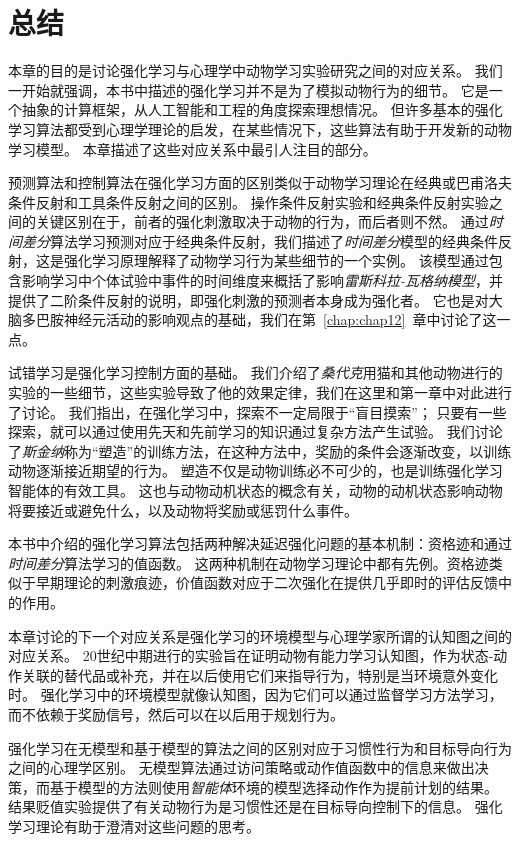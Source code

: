 \section{总结}

本章的目的是讨论强化学习与心理学中动物学习实验研究之间的对应关系。
我们一开始就强调，本书中描述的强化学习并不是为了模拟动物行为的细节。
它是一个抽象的计算框架，从人工智能和工程的角度探索理想情况。
但许多基本的强化学习算法都受到心理学理论的启发，在某些情况下，这些算法有助于开发新的动物学习模型。
本章描述了这些对应关系中最引人注目的部分。


预测算法和控制算法在强化学习方面的区别类似于动物学习理论在经典或巴甫洛夫条件反射和工具条件反射之间的区别。
操作条件反射实验和经典条件反射实验之间的关键区别在于，前者的强化刺激取决于动物的行为，而后者则不然。
通过\textit{时间差分}算法学习预测对应于经典条件反射，我们描述了\textit{时间差分}模型的经典条件反射，这是强化学习原理解释了动物学习行为某些细节的一个实例。
该模型通过包含影响学习中个体试验中事件的时间维度来概括了影响\textit{雷斯科拉-瓦格纳模型}，并提供了二阶条件反射的说明，即强化刺激的预测者本身成为强化者。
它也是对大脑多巴胺神经元活动的影响观点的基础，我们在第~\ref{chap:chap12}~章中讨论了这一点。


试错学习是强化学习控制方面的基础。
我们介绍了\textit{桑代克}用猫和其他动物进行的实验的一些细节，这些实验导致了他的效果定律，我们在这里和第一章中对此进行了讨论。
我们指出，在强化学习中，探索不一定局限于“盲目摸索”；
只要有一些探索，就可以通过使用先天和先前学习的知识通过复杂方法产生试验。
我们讨论了\textit{斯金纳}称为“塑造”的训练方法，在这种方法中，奖励的条件会逐渐改变，以训练动物逐渐接近期望的行为。
塑造不仅是动物训练必不可少的，也是训练强化学习智能体的有效工具。
这也与动物动机状态的概念有关，动物的动机状态影响动物将要接近或避免什么，以及动物将奖励或惩罚什么事件。


本书中介绍的强化学习算法包括两种解决延迟强化问题的基本机制：资格迹和通过\textit{时间差分}算法学习的值函数。
这两种机制在动物学习理论中都有先例。资格迹类似于早期理论的刺激痕迹，价值函数对应于二次强化在提供几乎即时的评估反馈中的作用。


本章讨论的下一个对应关系是强化学习的环境模型与心理学家所谓的认知图之间的对应关系。
20世纪中期进行的实验旨在证明动物有能力学习认知图，作为状态-动作关联的替代品或补充，并在以后使用它们来指导行为，特别是当环境意外变化时。
强化学习中的环境模型就像认知图，因为它们可以通过监督学习方法学习，而不依赖于奖励信号，然后可以在以后用于规划行为。


强化学习在无模型和基于模型的算法之间的区别对应于习惯性行为和目标导向行为之间的心理学区别。
无模型算法通过访问策略或动作值函数中的信息来做出决策，而基于模型的方法则使用\textit{智能体}环境的模型选择动作作为提前计划的结果。
结果贬值实验提供了有关动物行为是习惯性还是在目标导向控制下的信息。
强化学习理论有助于澄清对这些问题的思考。


